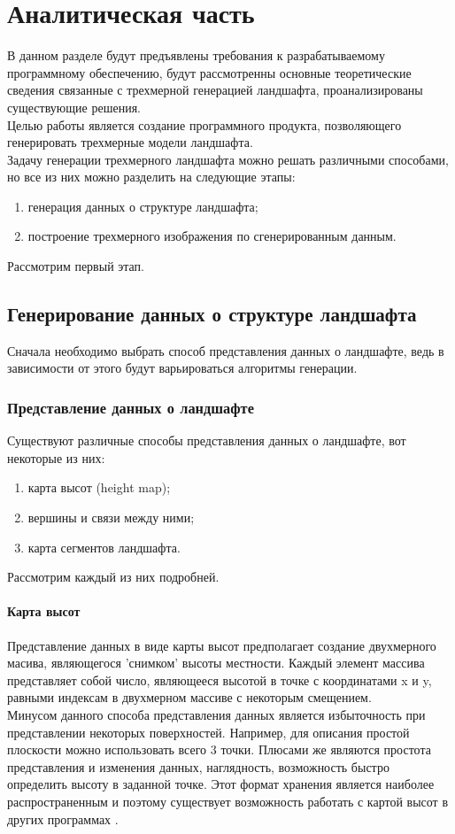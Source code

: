 \documentclass{article}
\begin{document}
	\section{Аналитическая часть}
	В данном разделе будут предъявлены требования к разрабатываемому программному обеспечению, будут рассмотренны основные теоретические сведения связанные с трехмерной генерацией ландшафта, проанализированы существующие решения.
\\ \indent
	Целью работы является создание программного продукта, позволяющего генерировать трехмерные модели ландшафта.
\\ \indent
	Задачу генерации трехмерного ландшафта можно решать различными способами, но все из них можно разделить на следующие этапы:
	\begin{enumerate}
		\item генерация данных о структуре ландшафта;
		\item построение трехмерного изображения по сгенерированным данным.
	\end{enumerate}
	Рассмотрим первый этап.
	\subsection{Генерирование данных о структуре ландшафта}
	Сначала необходимо выбрать способ представления данных о ландшафте, ведь в зависимости от этого будут варьироваться алгоритмы генерации.
	\subsubsection{Представление данных о ландшафте}
	\indent Существуют различные способы представления данных о ландшафте, вот некоторые из них:
           \begin{enumerate}
		\item карта высот (height map);
		\item вершины и связи между ними;
		\item карта сегментов ландшафта.
	\end{enumerate}
	Рассмотрим каждый из них подробней.
	\paragraph{Карта высот}
	\indent Представление данных в виде карты высот предполагает создание двухмерного масива, являющегося 'снимком' высоты местности. Каждый элемент массива представляет собой число, являющееся высотой в точке с координатами x и y, равными индексам в двухмерном массиве с некоторым смещением. \\
	\indent Минусом данного способа представления данных является избыточность при представлении некоторых поверхностей. Например, для описания простой плоскости можно использовать всего 3 точки. Плюсами же являются простота представления и изменения данных, наглядность, возможность быстро определить высоту в заданной точке. Этот формат хранения является наиболее распространенным и поэтому существует возможность работать с картой высот в других программах \cite{height-map}.
\end{document}
